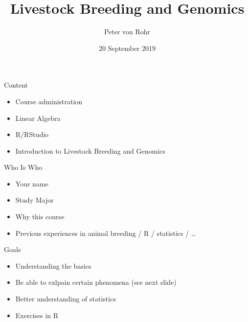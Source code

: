 \documentclass[ignorenonframetext,]{beamer}
\title{Livestock Breeding and Genomics}
\author{Peter von Rohr}
\date{20 September 2019}
\providecommand{\tightlist}{%
  \setlength{\itemsep}{0pt}\setlength{\parskip}{0pt}}
\begin{document}
\frame{\titlepage}

\begin{frame}{Content}
\protect\hypertarget{content}{}

\begin{itemize}
\tightlist
\item
  Course administration
\item
  Linear Algebra
\item
  R/RStudio
\item
  Introduction to Livestock Breeding and Genomics
\end{itemize}


\end{frame}

\begin{frame}{Who Is Who}
\protect\hypertarget{who-is-who}{}

\begin{itemize}
\tightlist
\item
  Your name
\item
  Study Major
\item
  Why this course
\item
  Previous experiences in animal breeding / R / statistics / \ldots{}
\end{itemize}


\end{frame}

\begin{frame}{Goals}
\protect\hypertarget{goals}{}

\begin{itemize}
\tightlist
\item
  Understanding the basics
\item
  Be able to exlpain certain phenomena (see next slide)
\item
  Better understanding of statistics
\item
  Exercises in R
\end{itemize}


\end{frame}
\end{document}
